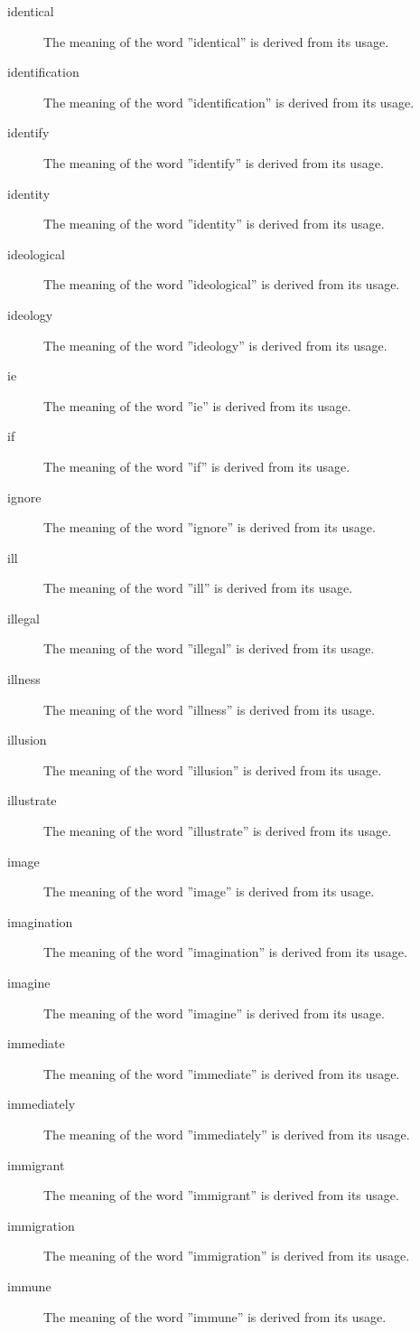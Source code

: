 \documentclass[12pt, letterpaper]{memoir}
\begin{document}
\begin{description}
\item[identical] The meaning of the word ''identical'' is derived from its usage.
\item[identification] The meaning of the word ''identification'' is derived from its usage.
\item[identify] The meaning of the word ''identify'' is derived from its usage.
\item[identity] The meaning of the word ''identity'' is derived from its usage.
\item[ideological] The meaning of the word ''ideological'' is derived from its usage.
\item[ideology] The meaning of the word ''ideology'' is derived from its usage.
\item[ie] The meaning of the word ''ie'' is derived from its usage.
\item[if] The meaning of the word ''if'' is derived from its usage.
\item[ignore] The meaning of the word ''ignore'' is derived from its usage.
\item[ill] The meaning of the word ''ill'' is derived from its usage.
\item[illegal] The meaning of the word ''illegal'' is derived from its usage.
\item[illness] The meaning of the word ''illness'' is derived from its usage.
\item[illusion] The meaning of the word ''illusion'' is derived from its usage.
\item[illustrate] The meaning of the word ''illustrate'' is derived from its usage.
\item[image] The meaning of the word ''image'' is derived from its usage.
\item[imagination] The meaning of the word ''imagination'' is derived from its usage.
\item[imagine] The meaning of the word ''imagine'' is derived from its usage.
\item[immediate] The meaning of the word ''immediate'' is derived from its usage.
\item[immediately] The meaning of the word ''immediately'' is derived from its usage.
\item[immigrant] The meaning of the word ''immigrant'' is derived from its usage.
\item[immigration] The meaning of the word ''immigration'' is derived from its usage.
\item[immune] The meaning of the word ''immune'' is derived from its usage.

\end{description}
\end{document}
